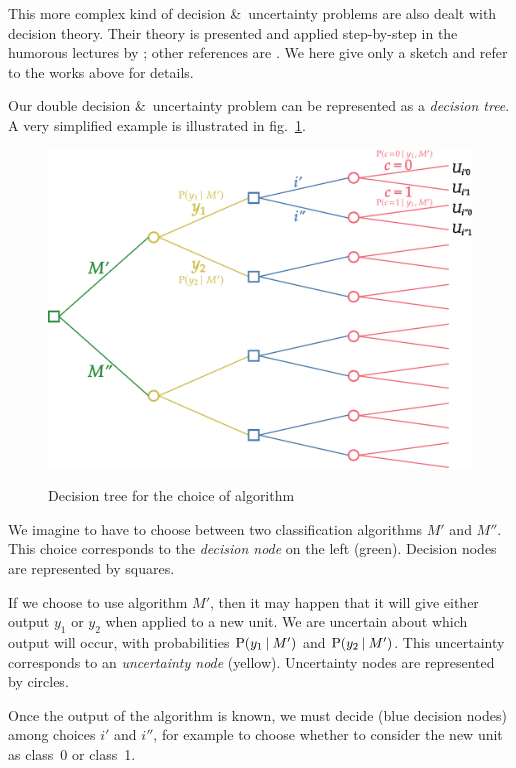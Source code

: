 \documentclass[\ifafour a4paper,12pt,\else a5paper,10pt,\fi%
onecolumn,oneside,article,%
british%
]{memoir}
\theoremstyle{remark}
\theoremstyle{innote}
\newcommand*{\amp}{\&}
\renewcommand*{\P}{\mathrm{P}}%
\renewcommand*{\|}[1][]{\nonscript\:#1\vert\nonscript\:\mathopen{}}
\newcommand*{\sect}{\S}%
\newcommand*{\chap}{ch.}%
\newcommand*{\fig}{fig.}%
\begin{document}
This more complex kind of decision \amp\ uncertainty problems are also dealt with decision theory. Their theory is presented  and applied step-by-step in the humorous lectures by \cites[\chap~2]{raiffa1968_r1970}; other references are  \autocites[\sect~2.2]{bernardoetal1994_r2000}{prattetal1995_r1996,raiffaetal1961_r2000,luceetal1957}. We here give only a sketch and refer to the works above for details.

Our double decision \amp\ uncertainty problem can be represented as a \emph{decision tree}. A very simplified example is illustrated in \fig~\ref{fig:decision_tree}.
\begin{figure}[!t]
  \centering
  \includegraphics[width=\linewidth]{decision_tree_algorithm.pdf}\\
  \caption{Decision tree for the choice of algorithm}
  \label{fig:decision_tree}
\end{figure}

We imagine to have to choose between two classification algorithms $M'$ and $M''$. This choice corresponds to the \emph{decision node} on the left (green). Decision nodes are represented by squares.

If we choose to use algorithm $M'$, then it may happen that it will give either output $y_{1}$ or $y_{2}$ when applied to a new unit. We are uncertain about which output will occur, with probabilities $\P(y_{1} \| M')$ and $\P(y_{2} \| M')$. This uncertainty corresponds to an \emph{uncertainty node} (yellow). Uncertainty nodes are represented by circles.

Once the output of the algorithm is known, we must decide (blue decision nodes) among choices $i'$ and $i''$, for example to choose whether to consider the new unit as class~0 or class~1.
\end{document}
